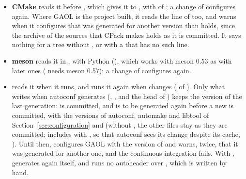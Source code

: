 \begin{itemize}
\item[$\bullet$] \textbf{CMake} reads it before , which gives
  it to , with  of
  ; a change of  configures
  again. Where GAOL is the project built, it reads the line
   of  too, and warns when it
  configures that  was generated for another version than
   holds, since the archive of the sources that CPack makes
  holds  as it is committed. It says nothing for a tree
  without , or with a  that has no such line.
\item[$\bullet$] \textbf{meson} reads it in , with Python
  (), which works with meson 0.53 as with later ones
  ( needs meson 0.57); a change of 
  configures again.
\item[$\bullet$] \textbf{} reads it when it runs, and
   runs it again when  changes
  ( of ). Only what
   writes when autoconf generates 
  (, ,
   and the head of ) keeps the
  version of the last generation:  is committed, and is to be
  generated again before a new  is committed, with the
  versions of autoconf, automake and libtool of
  Section~\ref{sec:configuration} and 
  (without  , the other files stay as they
  are committed;  includes  with
  , so that autoconf sees its change despite its cache,
  ). Until then,  configures GAOL with the
  version of  and warns, twice, that it was generated for
  another one, and the continuous integration fails. With
  ,  generates 
  again itself, and runs no autoheader over
  , which is written by hand.
\end{itemize}

